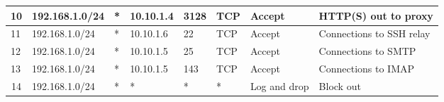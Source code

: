\documentclass[a4paper, 11pt, oneside]{article}
\begin{document}
\begin{table}[H]
{\begin{tabular}{|llllllll|}
\multicolumn{1}{|l|}{10}                        & \multicolumn{1}{l|}{192.168.1.0/24}                                               & \multicolumn{1}{l|}{*}                                                              & \multicolumn{1}{l|}{10.10.1.4}                                                         & \multicolumn{1}{l|}{3128}                                                                & \multicolumn{1}{l|}{TCP}               & \multicolumn{1}{l|}{Accept}          & HTTP(S) out to proxy                    \\ \hline
\multicolumn{1}{|l|}{11}                        & \multicolumn{1}{l|}{192.168.1.0/24}                                               & \multicolumn{1}{l|}{*}                                                              & \multicolumn{1}{l|}{10.10.1.6}                                                         & \multicolumn{1}{l|}{22}                                                                  & \multicolumn{1}{l|}{TCP}               & \multicolumn{1}{l|}{Accept}          & Connections to SSH relay               \\ \hline
\multicolumn{1}{|l|}{12}                        & \multicolumn{1}{l|}{192.168.1.0/24}                                               & \multicolumn{1}{l|}{*}                                                              & \multicolumn{1}{l|}{10.10.1.5}                                                         & \multicolumn{1}{l|}{25}                                                                  & \multicolumn{1}{l|}{TCP}               & \multicolumn{1}{l|}{Accept}          & Connections to SMTP                    \\ \hline
\multicolumn{1}{|l|}{13}                        & \multicolumn{1}{l|}{192.168.1.0/24}                                               & \multicolumn{1}{l|}{*}                                                              & \multicolumn{1}{l|}{10.10.1.5}                                                         & \multicolumn{1}{l|}{143}                                                                 & \multicolumn{1}{l|}{TCP}               & \multicolumn{1}{l|}{Accept}          & Connections to IMAP                    \\ \hline
\multicolumn{1}{|c|}{{\color[HTML]{000000} 14}} & \multicolumn{1}{l|}{192.168.1.0/24}                                               & \multicolumn{1}{l|}{*}                                                              & \multicolumn{1}{l|}{*}                                                                 & \multicolumn{1}{l|}{*}                                                                   & \multicolumn{1}{l|}{*}                 & \multicolumn{1}{l|}{Log and drop}    & Block out                              \\ \hline

\end{tabular}}
\end{table}
\end{document}
